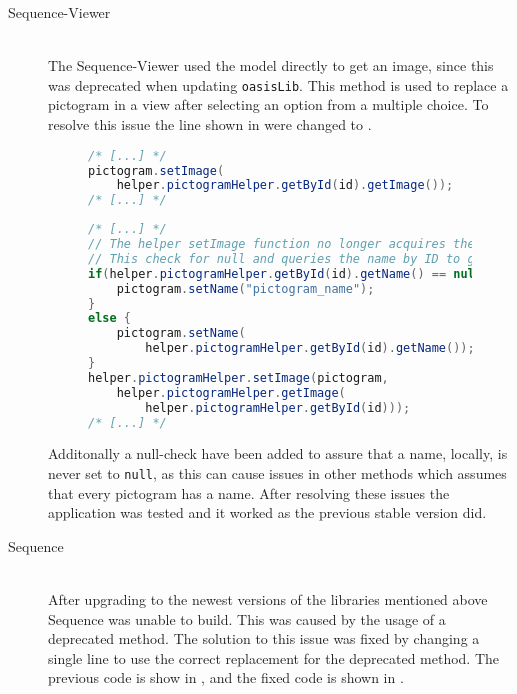\begin{description}
    \item[Sequence-Viewer] \hfill \\
    The Sequence-Viewer used the model directly to get an image, since this was deprecated when updating \texttt{oasisLib}.
    This method is used to replace a pictogram in a view after selecting an option from a multiple choice. 
    To resolve this issue the line shown in  were changed to . 
    \begin{figure}
        \begin{lstlisting}[language=java, caption={Sequence-Viewer with deprecated method call. }, label=lst:dep-sv-prev]
/* [...] */
pictogram.setImage(
    helper.pictogramHelper.getById(id).getImage());
/* [...] */
        \end{lstlisting}
    \end{figure}
    \begin{figure}
        \begin{lstlisting}[language=java, caption={Sequence-Viewer replacement code. }, label=lst:dep-sv-upd]
/* [...] */
// The helper setImage function no longer acquires the pictogram name and causes null exception error
// This check for null and queries the name by ID to get name
if(helper.pictogramHelper.getById(id).getName() == null) {
    pictogram.setName("pictogram_name");
}
else {
    pictogram.setName(
        helper.pictogramHelper.getById(id).getName());
}
helper.pictogramHelper.setImage(pictogram, 
    helper.pictogramHelper.getImage(
        helper.pictogramHelper.getById(id)));
/* [...] */
        \end{lstlisting}
    \end{figure}
    Additonally a null-check have been added to assure that a name, locally, is never set to \texttt{null}, as this can cause issues in other methods which assumes that every pictogram has a name. 
    After resolving these issues the application was tested and it worked as the previous stable version did. 
    \item[Sequence] \hfill \\
    After upgrading to the newest versions of the libraries mentioned above Sequence was unable to build. 
    This was caused by the usage of a deprecated method. 
    The solution to this issue was fixed by changing a single line to use the correct replacement for the deprecated method.
    The previous code is show in , and the fixed code is shown in .

\end{description}
